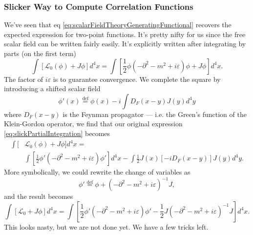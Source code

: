 \subsubsection{Slicker Way to Compute Correlation Functions}
We've seen that eq
\eqref{eq:scalarFieldTheoryGeneratingFunctional} recovers the
expected expression for two-point functions. It's pretty nifty
for us since the free scalar field can be written fairly
easily. It's explicitly written after integrating by parts (on
the first term)
\begin{equation}\label{eq:slickPartialIntegration}
\int[\mathcal{L}_{0}(\phi)+J\phi]d^{4}x 
= 
\int[\frac{1}{2}\phi(-\partial^{2}-m^{2}+i\varepsilon)\phi+J\phi]d^{4}x.
\end{equation}
The factor of $i\varepsilon$ is to guarantee convergence. We
complete the square by introducing a shifted scalar field
\begin{equation}%
\phi'(x)\stackrel{\text{def}}{=}\phi(x)-i\int D_{F}(x-y)J(y)d^{4}y
\end{equation}
where $D_{F}(x-y)$ is the Feynman propagator --- i.e. the Green's
function of the Klein-Gordon operator, we find that our original
expression \eqref{eq:slickPartialIntegration} becomes
\begin{equation}%
\begin{split}
\int[&\mathcal{L}_{0}(\phi)+J\phi]d^{4}x =\\
&\int[\frac{1}{2}\phi'(-\partial^{2}-m^{2}+i\varepsilon)\phi']d^{4}x
-\int\frac{1}{2}J(x)\left[-iD_{F}(x-y)\right]J(y)d^{4}y.
\end{split}
\end{equation}
More symbolically, we could rewrite the change of variables as
\begin{equation}%
\phi'\stackrel{\text{def}}{=}\phi+(-\partial^{2}-m^{2}+i\varepsilon)^{-1}J,
\end{equation}
and the result becomes
\begin{equation}%
\int[\mathcal{L}_0 + J\phi]d^{4}x = 
\int\left[\frac{1}{2}\phi'(-\partial^{2}-m^{2}+i\varepsilon)\phi'-\frac{1}{2}J(-\partial^{2}-m^{2}+i\varepsilon)^{-1}J\right]d^{4}x.
\end{equation}
This looks nasty, but we are not done yet. We have a few tricks
left.

